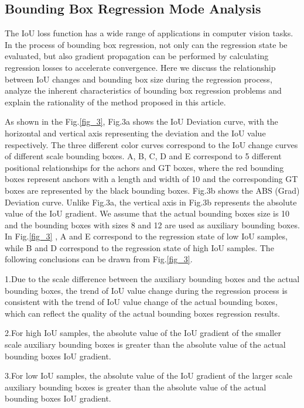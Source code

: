 \documentclass[lettersize,journal]{IEEEtran}
\begin{document}
	\subsection{Bounding Box Regression Mode Analysis}
	\par The IoU loss function has a wide range of applications in computer vision tasks. In the process of bounding box regression, not only can the regression state be evaluated, but also gradient propagation can be performed by calculating regression losses to accelerate convergence. Here we discuss the relationship between IoU changes and bounding box size during the regression process\cite{ref8}, analyze the inherent characteristics of bounding box regression problems and explain the rationality of the method proposed in this article.
	\par As shown in the Fig.\ref{fig_3}, Fig.3a shows the IoU Deviation curve, with the horizontal and vertical axis representing the deviation and the IoU value respectively. The three different color curves correspond to the IoU change curves of different scale bounding boxes. A, B, C, D and E correspond to 5 different positional relationships for the achors and GT boxes, where the red bounding boxes represent anchors with a length and width of 10 and the corresponding GT boxes are represented by the black bounding boxes. Fig.3b shows the ABS (Grad) Deviation curve. Unlike Fig.3a, the vertical axis in Fig.3b represents the absolute value of the IoU gradient.
	We assume that the actual bounding boxes size is 10 and the bounding boxes with sizes 8 and 12 are used as auxiliary bounding boxes. In Fig.\ref{fig_3} , A and E correspond to the regression state of low IoU samples, while B and D correspond to the regression state of high IoU samples. The following conclusions can be drawn from Fig.\ref{fig_3}.
	\par 1.Due to the scale difference between the auxiliary bounding boxes and the actual bounding boxes, the trend of IoU value change during the regression process is consistent with the trend of IoU value change of the actual bounding boxes, which can reflect the quality of the actual bounding boxes regression results.
	\par 2.For high IoU samples, the absolute value of the IoU gradient of the smaller scale auxiliary bounding boxes is greater than the absolute value of the actual bounding boxes IoU gradient.
	\par 3.For low IoU samples, the absolute value of the IoU gradient of the larger scale auxiliary bounding boxes is greater than the absolute value of the actual bounding boxes IoU gradient.
\end{document}
